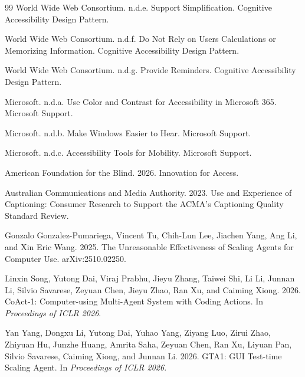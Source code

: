 \documentclass[11pt]{article}
\begin{document}
\begin{thebibliography}{99}
World Wide Web Consortium. n.d.e.
\newblock Support Simplification.
\newblock Cognitive Accessibility Design Pattern.

World Wide Web Consortium. n.d.f.
\newblock Do Not Rely on Users Calculations or Memorizing Information.
\newblock Cognitive Accessibility Design Pattern.

World Wide Web Consortium. n.d.g.
\newblock Provide Reminders.
\newblock Cognitive Accessibility Design Pattern.

Microsoft. n.d.a.
\newblock Use Color and Contrast for Accessibility in Microsoft 365.
\newblock Microsoft Support.

Microsoft. n.d.b.
\newblock Make Windows Easier to Hear.
\newblock Microsoft Support.

Microsoft. n.d.c.
\newblock Accessibility Tools for Mobility.
\newblock Microsoft Support.

American Foundation for the Blind. 2026.
\newblock Innovation for Access.

Australian Communications and Media Authority. 2023.
\newblock Use and Experience of Captioning: Consumer Research to Support the ACMA's Captioning Quality Standard Review.



Gonzalo Gonzalez-Pumariega, Vincent Tu, Chih-Lun Lee, Jiachen Yang, Ang Li, and Xin Eric Wang. 2025.
\newblock The Unreasonable Effectiveness of Scaling Agents for Computer Use.
\newblock arXiv:2510.02250.

Linxin Song, Yutong Dai, Viraj Prabhu, Jieyu Zhang, Taiwei Shi, Li Li, Junnan Li, Silvio Savarese, Zeyuan Chen, Jieyu Zhao, Ran Xu, and Caiming Xiong. 2026.
\newblock CoAct-1: Computer-using Multi-Agent System with Coding Actions.
\newblock In \emph{Proceedings of ICLR 2026}.

Yan Yang, Dongxu Li, Yutong Dai, Yuhao Yang, Ziyang Luo, Zirui Zhao, Zhiyuan Hu, Junzhe Huang, Amrita Saha, Zeyuan Chen, Ran Xu, Liyuan Pan, Silvio Savarese, Caiming Xiong, and Junnan Li. 2026.
\newblock GTA1: GUI Test-time Scaling Agent.
\newblock In \emph{Proceedings of ICLR 2026}.


\end{thebibliography}
\end{document}
